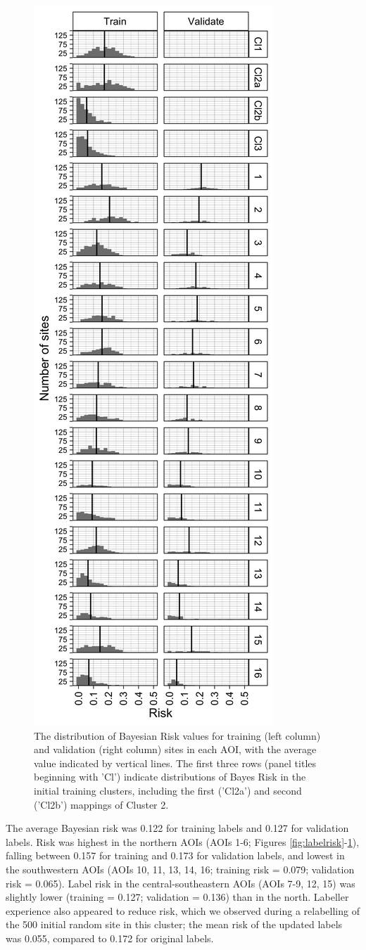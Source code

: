 \documentclass[
  11pt,
  a4paper]{article}
\begin{document}
\begin{figure}[!ht]

{\centering \includegraphics[width=0.4\linewidth,]{figures/si_label_risk_hists} 

}

\caption{The distribution of Bayesian Risk values for training (left column) and validation (right column) sites in each AOI, with the average value indicated by vertical lines. The first three rows (panel titles beginning with 'Cl') indicate distributions of Bayes Risk in the initial training clusters, including the first ('Cl2a') and second ('Cl2b') mappings of Cluster 2.}\label{fig:labelriskhist}
\end{figure}

The average Bayesian risk was 0.122 for training labels and 0.127 for
validation labels. Risk was highest in the northern AOIs (AOIs 1-6;
Figures \ref{fig:labelrisk}-\ref{fig:labelriskhist}), falling between
0.157 for training and 0.173 for validation labels, and lowest in the
southwestern AOIs (AOIs 10, 11, 13, 14, 16; training risk = 0.079;
validation risk = 0.065). Label risk in the central-southeastern AOIs
(AOIs 7-9, 12, 15) was slightly lower (training = 0.127; validation =
0.136) than in the north. Labeller experience also appeared to reduce
risk, which we observed during a relabelling of the 500 initial random
site in this cluster; the mean risk of the updated labels was 0.055,
compared to 0.172 for original labels.
\end{document}
